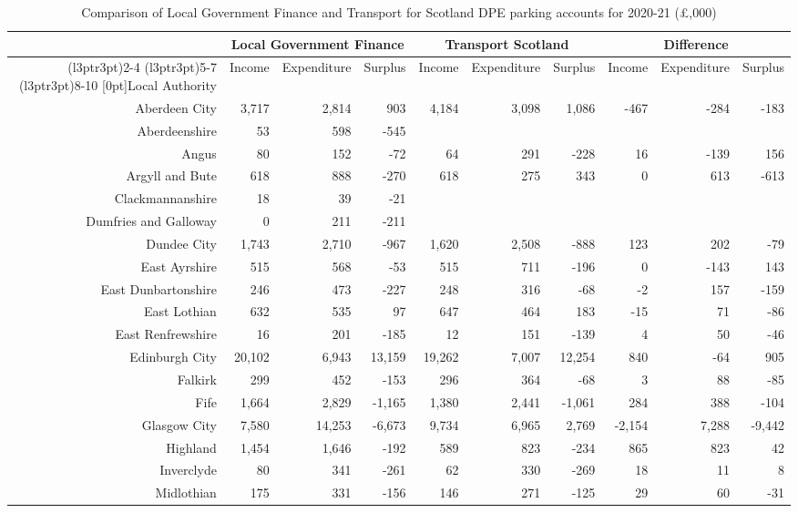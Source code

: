 \documentclass[
  12pt,
]{article}
\begin{document}
\begin{landscape}
\begin{table}[H]
\caption{\label{tab:comparetab}Comparison of Local Government Finance and Transport for Scotland DPE parking accounts for 2020-21 (£,000)}
\centering
\fontsize{7}{9}\selectfont
\begin{tabular}[t]{rrrrrrrrrr}
\toprule
\multicolumn{1}{c}{ } & \multicolumn{3}{c}{Local Government Finance} & \multicolumn{3}{c}{Transport Scotland} & \multicolumn{3}{c}{Difference} \\
\cmidrule(l{3pt}r{3pt}){2-4} \cmidrule(l{3pt}r{3pt}){5-7} \cmidrule(l{3pt}r{3pt}){8-10}
\multirow{1}{*}[0pt]{Local Authority} & Income & Expenditure & Surplus & Income & Expenditure & Surplus & Income & Expenditure & Surplus\\
\midrule
Aberdeen City & 3,717 & 2,814 & 903 & 4,184 & 3,098 & 1,086 & -467 & -284 & -183\\
Aberdeenshire & 53 & 598 & -545 &  &  &  &  &  & \\
Angus & 80 & 152 & -72 & 64 & 291 & -228 & 16 & -139 & 156\\
Argyll and Bute & 618 & 888 & -270 & 618 & 275 & 343 & 0 & 613 & -613\\
Clackmannanshire & 18 & 39 & -21 &  &  &  &  &  & \\
Dumfries and Galloway & 0 & 211 & -211 &  &  &  &  &  & \\
Dundee City & 1,743 & 2,710 & -967 & 1,620 & 2,508 & -888 & 123 & 202 & -79\\
East Ayrshire & 515 & 568 & -53 & 515 & 711 & -196 & 0 & -143 & 143\\
East Dunbartonshire & 246 & 473 & -227 & 248 & 316 & -68 & -2 & 157 & -159\\
East Lothian & 632 & 535 & 97 & 647 & 464 & 183 & -15 & 71 & -86\\
East Renfrewshire & 16 & 201 & -185 & 12 & 151 & -139 & 4 & 50 & -46\\
Edinburgh City & 20,102 & 6,943 & 13,159 & 19,262 & 7,007 & 12,254 & 840 & -64 & 905\\
Falkirk & 299 & 452 & -153 & 296 & 364 & -68 & 3 & 88 & -85\\
Fife & 1,664 & 2,829 & -1,165 & 1,380 & 2,441 & -1,061 & 284 & 388 & -104\\
Glasgow City & 7,580 & 14,253 & -6,673 & 9,734 & 6,965 & 2,769 & -2,154 & 7,288 & -9,442\\
Highland & 1,454 & 1,646 & -192 & 589 & 823 & -234 & 865 & 823 & 42\\
Inverclyde & 80 & 341 & -261 & 62 & 330 & -269 & 18 & 11 & 8\\
Midlothian & 175 & 331 & -156 & 146 & 271 & -125 & 29 & 60 & -31\\

\end{tabular}
\end{table}
\end{landscape}
\end{document}
